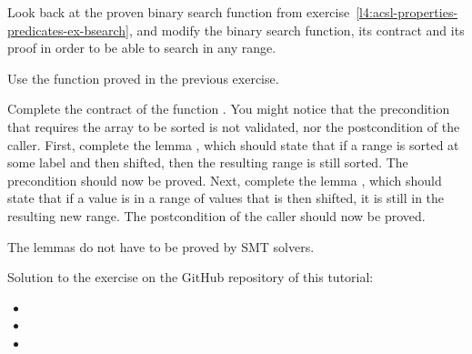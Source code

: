 Look back at the proven binary search function from
exercise~\ref{l4:acsl-properties-predicates-ex-bsearch}, and modify the binary
search function, its contract and its proof in order to be able to search in
any range.


Use the  function proved in the previous exercise.


Complete the contract of the function . You might
notice that the precondition that requires the array to be sorted is not
validated, nor the postcondition of the caller. First, complete the lemma
, which should state that if a range is sorted
at some label and then shifted, then the resulting range is still sorted. The
precondition should now be proved. Next, complete the lemma
, which should state that if a value is in a range
of values that is then shifted, it is still in the resulting new range. The
postcondition of the caller should now be proved.


The lemmas do not have to be proved by SMT solvers.


\begin{Information}
  Solution to the exercise on the GitHub repository of this tutorial:
  \begin{itemize}
    \item {}
    \item {}
    \item {}
  \end{itemize}
\end{Information}
